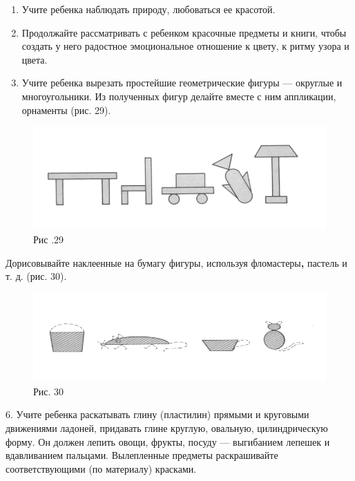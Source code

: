 \documentclass[a5paper]{book}
\begin{document}
\begin{enumerate}
\def\labelenumi{\arabic{enumi}.}
\setcounter{enumi}{2}
\item
  
  Учите ребенка наблюдать природу, любоваться ее красотой.
  
\item
  
  Продолжайте рассматривать с ребенком красочные предметы и книги, чтобы
  создать у него радостное эмоциональное отношение к цвету, к ритму
  узора и цвета.
  
\item
  
  Учите ребенка вырезать простейшие геометрические фигуры --- округлые и
  многоугольники. Из полученных фигур делайте вместе с ним аппликации,
  орнаменты (рис. 29).
  
\end{enumerate}


\begin{figure}
\centering
\includegraphics[width=\linewidth]{media/media/image26.png}
\caption*{Рис .29}
\end{figure}

Дорисовывайте наклеенные на бумагу фигуры, используя
фломастеры\textbf{,} пастель и т. д. (рис. 30).

\begin{figure}
\centering
\includegraphics[width=\linewidth]{media/media/image27.png}
\caption*{Рис. 30}
\end{figure}

6. Учите ребенка раскатывать глину (пластилин) прямыми и круговыми
движениями ладоней, придавать глине круглую, овальную, цилиндрическую
форму. Он должен лепить овощи, фрукты, посуду --- выгибанием лепешек и
вдавливанием пальцами. Вылепленные предметы раскрашивайте
соответствующими (по материалу) красками.
\end{document}
